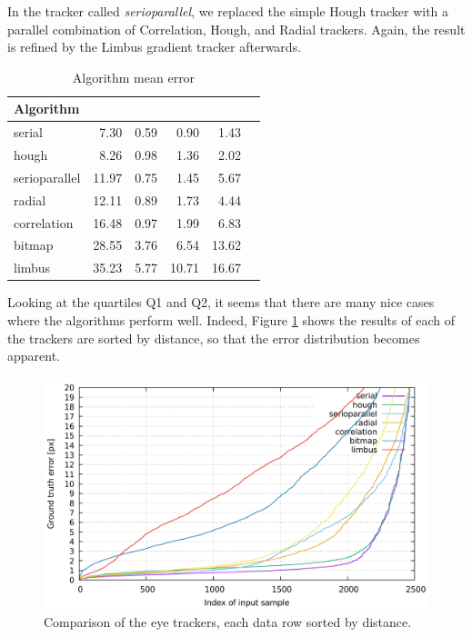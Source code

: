 In the tracker called \textit{serioparallel}, we replaced the simple Hough tracker with a parallel combination of Correlation, Hough, and Radial trackers.
Again, the result is refined by the Limbus gradient tracker afterwards.

\begin{table}[h]
\centering
\begin{tabular}{l@{\hspace{1.5cm}}D{.}{.}{3.2}D{.}{.}{3.2}D{.}{.}{3.2}D{.}{.}{3.2}D{.}{.}{3.2}}
\toprule
\textbf{Algorithm} &  &  &  &  \\
\midrule
serial & 7.30 & 0.59 & 0.90 & 1.43 \\
hough & 8.26 & 0.98 & 1.36 & 2.02 \\
serioparallel & 11.97 & 0.75 & 1.45 & 5.67 \\
radial & 12.11 & 0.89 & 1.73 & 4.44 \\
correlation & 16.48 & 0.97 & 1.99 & 6.83 \\
bitmap & 28.55 & 3.76 & 6.54 & 13.62 \\
limbus & 35.23 & 5.77 & 10.71 & 16.67 \\
\bottomrule
\end{tabular}
\caption{Algorithm mean error}\label{t:algo-mean}
\end{table}

Looking at the quartiles Q1 and Q2, it seems that there are many nice cases where the algorithms perform well.
Indeed, Figure \ref{i:res-graph} shows the results of each of the trackers are sorted by distance, so that the error distribution becomes apparent.

\begin{figure}[t]
	\centering
	\includegraphics[width=\linewidth]{img/res-graph.pdf}
	\caption{Comparison of the eye trackers, each data row sorted by distance.} \label{i:res-graph}
\end {figure}


